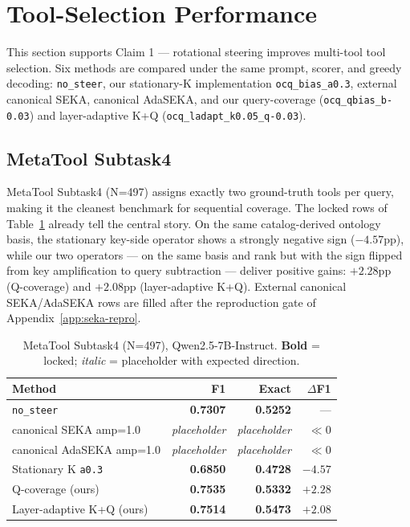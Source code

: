 \section{Tool-Selection Performance}\label{sec:exp:performance}

This section supports Claim 1 --- rotational steering improves multi-tool tool selection. Six methods are compared under the same prompt, scorer, and greedy decoding: \texttt{no\_steer}, our stationary-K implementation \texttt{ocq\_bias\_a0.3}, external canonical SEKA, canonical AdaSEKA, and our query-coverage (\texttt{ocq\_qbias\_b-0.03}) and layer-adaptive K+Q (\texttt{ocq\_ladapt\_k0.05\_q-0.03}).

\subsection{MetaTool Subtask4}\label{sec:exp:metatool}

MetaTool Subtask4 (N=497) assigns exactly two ground-truth tools per query, making it the cleanest benchmark for sequential coverage. The locked rows of Table~\ref{tab:e1-subtask4} already tell the central story. On the same catalog-derived ontology basis, the stationary key-side operator shows a strongly negative sign ($-4.57$pp), while our two operators --- on the same basis and rank but with the sign flipped from key amplification to query subtraction --- deliver positive gains: $+2.28$pp (Q-coverage) and $+2.08$pp (layer-adaptive K+Q). External canonical SEKA/AdaSEKA rows are filled after the reproduction gate of Appendix~\ref{app:seka-repro}.

\begin{table}[t]
\centering
\caption{MetaTool Subtask4 (N=497), Qwen2.5-7B-Instruct. \textbf{Bold} = locked; \emph{italic} = placeholder with expected direction.}
\label{tab:e1-subtask4}
\small
\begin{tabularx}{\linewidth}{@{}Xrrr@{}}
\toprule
Method & F1 & Exact & $\Delta$F1 \\
\midrule
\texttt{no\_steer} & \textbf{0.7307} & \textbf{0.5252} & --- \\
canonical SEKA amp=1.0 & \emph{placeholder} & \emph{placeholder} & $\ll 0$ \\
canonical AdaSEKA amp=1.0 & \emph{placeholder} & \emph{placeholder} & $\ll 0$ \\
Stationary K \texttt{a0.3} & \textbf{0.6850} & \textbf{0.4728} & $\mathbf{-4.57}$ \\
Q-coverage (ours) & \textbf{0.7535} & \textbf{0.5332} & $\mathbf{+2.28}$ \\
Layer-adaptive K+Q (ours) & \textbf{0.7514} & \textbf{0.5473} & $\mathbf{+2.08}$ \\
\bottomrule
\end{tabularx}
\end{table}

